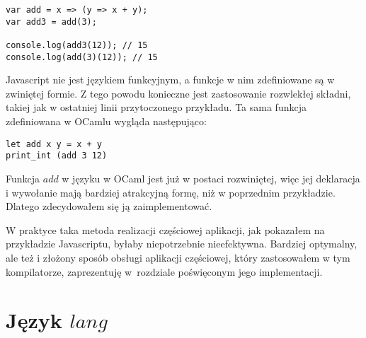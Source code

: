 \documentclass[declaration,shortabstract]{iithesis}
\begin{document}
\begin{lstlisting}[frame=single, caption=Rozwinięcie funkcji w Javascriptcie.]
var add = x => (y => x + y);
var add3 = add(3);

console.log(add3(12)); // 15
console.log(add(3)(12)); // 15
\end{lstlisting}

Javascript nie jest językiem funkcyjnym, a funkcje w nim zdefiniowane są w 
zwiniętej formie. Z tego powodu konieczne jest zastosowanie rozwlekłej składni, 
takiej jak w ostatniej linii przytoczonego przykładu. Ta sama funkcja 
zdefiniowana w OCamlu wygląda następująco:

\begin{lstlisting}[frame=single, caption=Rozwinięta funkcja w OCamlu.]
let add x y = x + y 
print_int (add 3 12)
\end{lstlisting}

Funkcja $add$ w języku w OCaml jest już w postaci rozwiniętej, więc jej 
deklaracja i wywołanie mają bardziej atrakcyjną formę, niż w poprzednim 
przykładzie. Dlatego zdecydowałem się ją zaimplementować.

W praktyce taka metoda realizacji częściowej aplikacji, jak pokazałem na 
przykładzie Javascriptu, byłaby niepotrzebnie nieefektywna. Bardziej optymalny,
ale też i złożony sposób obsługi aplikacji częściowej, który zastosowałem w tym 
kompilatorze, zaprezentuję w~rozdziale poświęconym jego implementacji.



\chapter{Język $lang$}
\end{document}
